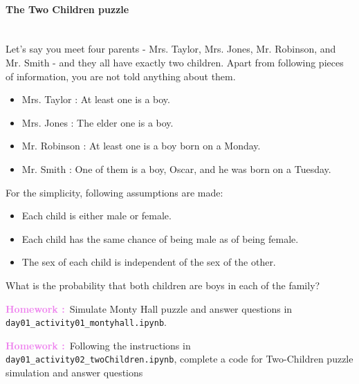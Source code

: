 \documentclass[a4paper,11pt]{exam}
\newcounter{ct}
\newcounter{homework}
\newcommand{\homework}{\stepcounter{homework}\textcolor{violet}{\textbf{Homework \thehomework:}~}}
\newcommand{\myparagraph}[1]{\paragraph{#1}\mbox{}\\}
\begin{document}
\myparagraph{The Two Children puzzle}
Let's say you meet four parents - Mrs. Taylor, Mrs. Jones, Mr. Robinson, and Mr. Smith - and they all have exactly two children. Apart from following pieces of information, you are not told anything about them.
\begin{tcolorbox}[colback=white]
	\begin{itemize}
		\item Mrs. Taylor : At least one is a boy.
		\item Mrs. Jones : The elder one is a boy.
		\item Mr. Robinson :  At least one is a boy born on a Monday.
		\item Mr. Smith : One of them is a boy, Oscar, and he was born on a Tuesday.
	\end{itemize}
\end{tcolorbox}

For the simplicity, following assumptions are made:

\begin{itemize}
	\item Each child is either male or female.
	\item Each child has the same chance of being male as of being female.
	\item The sex of each child is independent of the sex of the other.
\end{itemize}

\begin{questions}
	\question What is the probability that both children are boys in each of the family?
\end{questions}
\newpage
\homework Simulate Monty Hall puzzle and answer questions in \\ \verb|day01_activity01_montyhall.ipynb|.

\vspace{5em}

\homework Following the instructions in \verb|day01_activity02_twoChildren.ipynb|, complete a code for Two-Children puzzle simulation and answer questions
\end{document}
